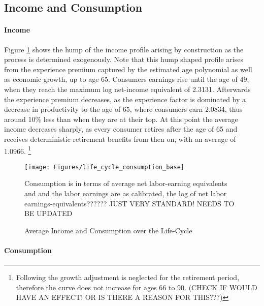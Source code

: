 \documentclass[a4paper,12pt]{article}
\begin{document}
\subsection{Income and Consumption}

\paragraph{Income} Figure \ref{consumption_life_cycle} shows the hump of the income profile arising by construction as the process is determined exogenously. Note that this hump shaped profile arises from the experience premium captured by the estimated age polynomial as well as economic growth, up to age 65. Consumers earnings rise until the age of 49, when they reach the maximum log net-income equivalent of 2.3131. Afterwards the experience premium decreases, as the experience factor is dominated by a decrease in productivity to the age of 65, where consumers earn 2.0834, thus around 10\% less than when they are at their top. At this point the average income decreases sharply, as every consumer retires after the age of 65 and receives deterministic retirement benefits from then on, with an average of 1.0966. \footnote{Following \cite{hintermaier2011} the growth adjustment is neglected for the retirement period, therefore the curve does not increase for ages 66 to 90. (CHECK IF WOULD HAVE AN EFFECT! OR IS THERE A REASON FOR THIS???)} 

\begin{figure}[!htbp]
\caption{Average Income and Consumption over the Life-Cycle} 
\label{consumption_life_cycle}	%
\centering
\texttt{[image: Figures/life\_cycle\_consumption\_base]}  %

\begin{minipage}{0.8\linewidth}
\footnotesize{Consumption is in terms of average net labor-earning equivalents and and the labor earnings are as calibrated, the log of net labor earnings-equivalents?????? JUST VERY STANDARD! NEEDS TO BE UPDATED}
\end{minipage}

\end{figure}

\paragraph{Consumption}
\end{document}

